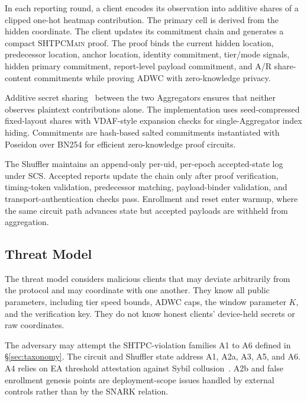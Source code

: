 \documentclass[journal]{IEEEtran}
\theoremstyle{definition}
\theoremstyle{plain}
\begin{document}
In each reporting round, a client encodes its observation into additive shares
of a clipped one-hot heatmap contribution. The primary cell is derived from the
hidden coordinate. The client updates its commitment chain and generates a
compact \textsc{SHTPCMain} proof. The proof binds the current hidden location,
predecessor location, anchor location, identity commitment, tier/mode signals,
hidden primary commitment, report-level payload commitment, and A/R
share-content commitments while proving ADWC with zero-knowledge privacy.

Additive secret sharing~\cite{Shamir1979Secret} between the two Aggregators
ensures that neither observes plaintext contributions alone. The implementation uses
seed-compressed fixed-layout shares with VDAF-style expansion checks for
single-Aggregator index hiding.
Commitments are hash-based salted commitments instantiated with Poseidon over
BN254 for efficient zero-knowledge proof circuits.

The Shuffler maintains an append-only per-uid, per-epoch accepted-state log
under SCS. Accepted reports update the chain only after proof verification,
timing-token validation, predecessor matching, payload-binder validation, and
transport-authentication checks pass. Enrollment and reset enter warmup, where
the same circuit path advances state but accepted payloads are withheld from
aggregation.

\subsection{Threat Model}
\label{sec:threat}

The threat model considers malicious clients that may deviate arbitrarily from the protocol and
may coordinate with one another. They know all public parameters, including tier
speed bounds, ADWC caps, the window parameter $K$, and the verification key.
They do not know honest clients' device-held secrets or raw coordinates.

The adversary may attempt the SHTPC-violation families A1 to A6 defined in
\S\ref{sec:taxonomy}. The circuit and Shuffler state address A1, A2a, A3, A5,
and A6. A4 relies on EA threshold attestation against Sybil
collusion~\cite{Douceur2002Sybil}. A2b and false enrollment genesis points are
deployment-scope issues handled by external controls rather than by the SNARK
relation.
\end{document}
